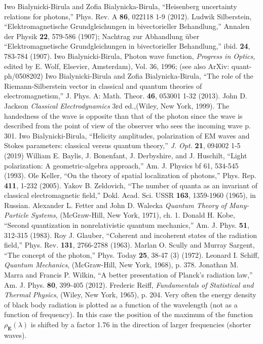 \documentclass[onecolumn,aps,pra,12pt]{revtex4-1}
\begin{document}
\begin{thebibliography}{00}
 Iwo Bialynicki-Birula and Zofia Bialynicka-Birula, ``Heisenberg uncertainty relations for photons,'' Phys. Rev. A {\bf 86}, 022118 1-9 (2012).
 Ludwik Silberstein, ``Elektromagnetische Grundgleichungen in bivectorieller Behandlung,'' Annalen der Physik {\bf 22}, 579-586 (1907); Nachtrag zur Abhandlung \"uber ``Elektromagnetische Grundgleichungen in bivectorieller Behandlung,'' ibid. {\bf 24}, 783-784 (1907).
 Iwo Bialynicki-Birula, Photon wave function, {\em Progress in Optics}, edited by E. Wolf, Elsevier, Amsterdam), Vol. 36, 1996; (see also ArXiv: quant-ph/0508202)
 Iwo Bialynicki-Birula and Zofia Bialynicka-Birula, ``The role of the Riemann-Silberstein vector in classical and quantum theories of electromagnetism,'' J. Phys. A: Math. Theor. {\bf 46}, 053001 1-32 (2013).
 John D. Jackson {\em Classical Electrodynamics} 3rd ed.,(Wiley, New York, 1999).
 The handedness of the wave is opposite than that of the photon since the wave is described from the point of view of the observer who sees the incoming wave \cite{jack} p. 301.
 Iwo Bialynicki-Birula, ``Helicity amplitudes, polarization of EM waves and Stokes parameters: classical versus quantum theory,'' {\em J. Opt.} {\bf 21}, 094002 1-5 (2019)
 William E. Baylis, J. Bonenfant, J. Derbyshire, and J. Huschilt, ``Light polarization: A geometric-algebra approach,'' Am. J. Physics {bf 61}, 534-545 (1993).
 Ole Keller, ``On the theory of spatial localization of photons,'' Phys. Rep. {\bf 411}, 1-232 (2005).
 Yakov B. Zeldovich, ``The number of quanta as an invariant of classical electromagnetic field,'' Dokl. Acad. Sci. USSR {\bf 163}, 1359-1960 (1965), in Russian.
 Alexander L. Fetter and John D. Walecka {\em Quantum Theory of Many-Particle Systems}, (McGraw-Hill, New York, 1971), ch. 1.
 Donald H. Kobe, ``Second quantization in nonrelativistic quantum mechanics,'' Am. J. Phys. {\bf 51}, 312-315 (1983).
 Roy J. Glauber, ``Coherent and incoherent states of the radiation field,'' Phys. Rev. {\bf 131}, 2766-2788 (1963).
 Marlan O. Scully and Murray Sargent, ``The concept of the photon,'' Phys. Today {\bf 25}, 38-47 (3) (1972).
 Leonard I. Schiff, {\em Quantum Mechanics}, (McGraw-Hill, New York, 1968), p. 378.
 Jonathan M. Marra and Francis P. Wilkin, ``A better presentation of Planck’s radiation law,'' Am. J. Phys. {\bf 80}, 399-405 (2012).
 Frederic Reiff, {\em Fundamentals of Statistical and Thermal Physics}, (Wiley, New York, 1965), p. 204.
 Very often the energy density of black body radiation is plotted as a function of the wavelength (not as a function of frequency). In this case the position of the maximum of the function $\rho_{\bm E}(\lambda)$ is shifted by a factor 1.76 in the direction of larger frequencies (shorter waves).
\end{thebibliography}
\end{document}
